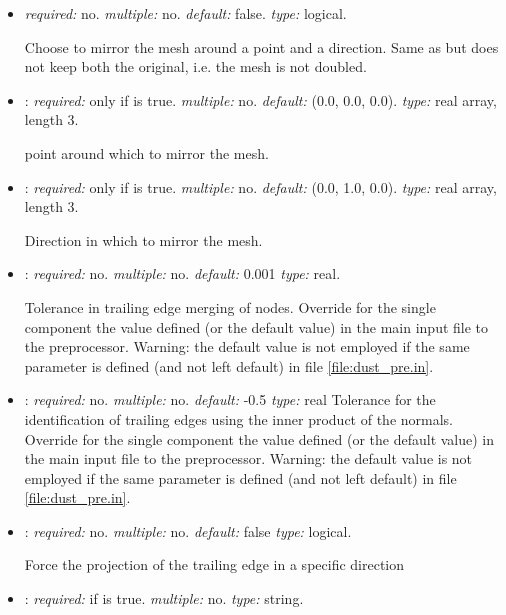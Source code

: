\begin{itemize}
Direction in which to reflect the mesh.

\item {} \textit{required:} no. \textit{multiple:} no. \textit{default:} false. \textit{type:} logical.

Choose to mirror the mesh around a point and a direction. Same as  
but does not keep both the original, i.e. the mesh is not doubled.

\item {}: \textit{required:} only if  is true. 
\textit{multiple:} no. \textit{default:} (0.0, 0.0, 0.0). \textit{type:} real array, length 3.

point around which to mirror the mesh.

\item {}: \textit{required:} only if  is true. 
\textit{multiple:} no. \textit{default:} (0.0, 1.0, 0.0). \textit{type:} real array, length 3.

Direction in which to mirror the mesh.

\item {}: \textit{required:} no. \textit{multiple:} no. \textit{default:} 0.001 \textit{type:} real.

Tolerance in trailing edge merging of nodes. Override for the single component the value 
defined (or the default value) in the main input file to the preprocessor. 
Warning: the default value is not employed if the same parameter is defined (and not left default) in file \ref{file:dust_pre.in}. 

\item {}: \textit{required:} no. \textit{multiple:} no. \textit{default:} -0.5 \textit{type:} real
Tolerance for the identification of trailing edges using the inner product of the normals.
Override for the single component the value defined (or the default value) 
in the main input file to the preprocessor. Warning: the default value is not 
employed if the same parameter is defined (and not left default) in file \ref{file:dust_pre.in}. 

\item {}: \textit{required:} no. \textit{multiple:} no. \textit{default:} false \textit{type:} logical.

Force the projection of the trailing edge in a specific direction

\item {}: \textit{required:} if  is true. \textit{multiple:} no. \textit{type:} string.


\end{itemize}
